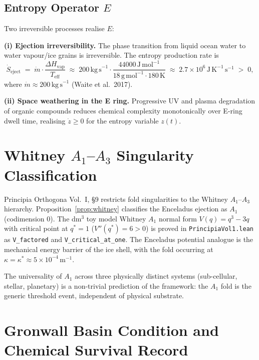 \documentclass[12pt]{article}
\numberwithin{equation}{section}
\theoremstyle{remark}
\begin{document}
\subsection{Entropy Operator $E$}
\label{sec:entropy}

Two irreversible processes realise $E$:

\textbf{(i) Ejection irreversibility.} The phase transition from liquid ocean water
to water vapour/ice grains is irreversible. The entropy production rate is
\[
  \dot{S}_{\mathrm{eject}}
  \;=\; \dot{m}\cdot\frac{\Delta H_{\mathrm{vap}}}{T_{\mathrm{eff}}}
  \;\approx\; 200\,\mathrm{kg\,s}^{-1}\cdot
  \frac{44000\,\mathrm{J\,mol}^{-1}}{18\,\mathrm{g\,mol}^{-1}\cdot 180\,\mathrm{K}}
  \;\approx\; 2.7\times 10^6\,\mathrm{J\,K}^{-1}\,\mathrm{s}^{-1} \;>\; 0,
\]
where $\dot{m}\approx 200\,\mathrm{kg\,s}^{-1}$ (Waite et al.\ 2017).

\textbf{(ii) Space weathering in the E ring.} Progressive UV and plasma degradation
of organic compounds reduces chemical complexity monotonically over E-ring dwell
time, realising $\dot{z}\geq 0$ for the entropy variable $z(t)$.

\section{Whitney \texorpdfstring{$A_1$}{A1}--\texorpdfstring{$A_3$}{A3}
         Singularity Classification}

Principia Orthogona Vol.~I, \S9 restricts fold singularities to the Whitney
$A_1$--$A_3$ hierarchy. Proposition~\ref{prop:whitney} classifies the
Enceladus ejection as $A_1$ (codimension 0). The dm$^3$ toy model Whitney $A_1$
normal form $V(q) = q^3 - 3q$ with critical point at $q^*=1$
($V''(q^*)=6>0$) is proved in \texttt{PrincipiaVol1.lean} as
\texttt{V\_factored} and \texttt{V\_critical\_at\_one}.
The Enceladus potential analogue is the mechanical energy barrier of the ice
shell, with the fold occurring at $\kappa = \kappa^*\approx 5\times 10^{-4}\,\mathrm{m}^{-1}$.

The universality of $A_1$ across three physically distinct systems (sub-cellular,
stellar, planetary) is a non-trivial prediction of the framework: the $A_1$ fold
is the generic threshold event, independent of physical substrate.

\section{Gronwall Basin Condition and Chemical Survival Record}
\label{sec:gronwall}
\end{document}
